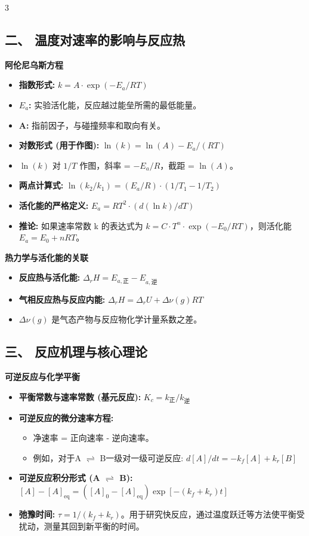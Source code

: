 \documentclass[a4paper,6pt]{article} %
\begin{document}
\begin{multicols}{3}
\subsection*{二、 温度对速率的影响与反应热}
\textbf{阿伦尼乌斯方程}
\begin{itemize}
    \item \textbf{指数形式:} $k = A \cdot \exp(-E_a / RT)$
    \item \textbf{$E_a$:} 实验活化能，反应越过能垒所需的最低能量。
    \item \textbf{A:} 指前因子，与碰撞频率和取向有关。
    \item \textbf{对数形式 (用于作图):} $\ln(k) = \ln(A) - E_a / (RT)$
    \item $\ln(k)$ 对 $1/T$ 作图，斜率 = $-E_a/R$，截距 = $\ln(A)$。
    \item \textbf{两点计算式:} $\ln(k_2/k_1) = (E_a/R) \cdot (1/T_1 - 1/T_2)$
    \item \textbf{活化能的严格定义:} $E_a = RT^2 \cdot (d(\ln k) / dT)$
    \item \textbf{推论:} 如果速率常数 k 的表达式为 $k = C \cdot T^n \cdot \exp(-E_0 / RT)$，则活化能 $E_a = E_0 + nRT$。
\end{itemize}

\textbf{热力学与活化能的关联}
\begin{itemize}
    \item \textbf{反应热与活化能:} $\Delta_r H = E_{a,\text{正}} - E_{a,\text{逆}}$
    \item \textbf{气相反应热与反应内能:} $\Delta_r H = \Delta_r U + \Delta\nu(g)RT$
    \item $\Delta\nu(g)$ 是气态产物与反应物化学计量系数之差。
\end{itemize}

\subsection*{三、 反应机理与核心理论}
\textbf{可逆反应与化学平衡}
\begin{itemize}
    \item \textbf{平衡常数与速率常数 (基元反应):} $K_c = k_{\text{正}} / k_{\text{逆}}$
    \item \textbf{可逆反应的微分速率方程:}
    \begin{itemize}
        \item 净速率 = 正向速率 - 逆向速率。
        \item 例如，对于A $\rightleftharpoons$ B一级对一级可逆反应: $d[A]/dt = -k_f[A] + k_r[B]$
    \end{itemize}
    \item \textbf{可逆反应积分形式 (A $\rightleftharpoons$ B):} $[A] - [A]_{\text{eq}} = ([A]_0 - [A]_{\text{eq}}) \exp[-(k_f + k_r)t]$
    \item \textbf{弛豫时间:} $\tau = 1/(k_f + k_r)$。用于研究快反应，通过温度跃迁等方法使平衡受扰动，测量其回到新平衡的时间。
\end{itemize}


\end{multicols}
\end{document}
